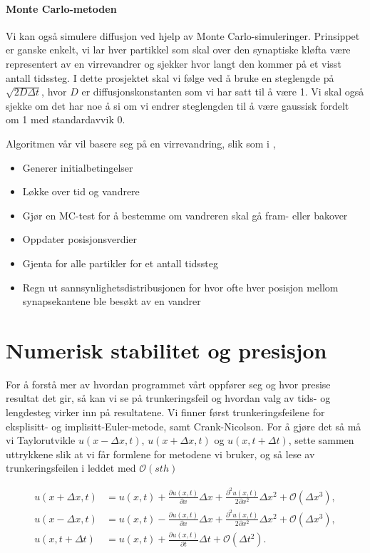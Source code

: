 \documentclass[norsk, 10pt]{article}
\begin{document}
\paragraph{Monte Carlo-metoden}
Vi kan også simulere diffusjon ved hjelp av Monte Carlo-simuleringer. Prinsippet er ganske enkelt, vi lar hver partikkel som skal over den synaptiske kløfta være representert av en virrevandrer og sjekker hvor langt den kommer på et visst antall tidssteg. I dette prosjektet skal vi følge \cite{farnell} ved å bruke en steglengde på $\sqrt{2D\Delta t}$, hvor $D$ er diffusjonskonstanten som vi har satt til å være 1. Vi skal også sjekke om det har noe å si om vi endrer steglengden til å være gaussisk fordelt om 1 med standardavvik 0.

Algoritmen vår vil basere seg på en virrevandring, slik som i \cite{mhj},
\begin{itemize}
\item 
Generer initialbetingelser
\item 
Løkke over tid og vandrere
\item
Gjør en MC-test for å bestemme om vandreren skal gå fram- eller bakover
\item
Oppdater posisjonsverdier
\item
Gjenta for alle partikler for et antall tidssteg
\item
Regn ut sannsynlighetsdistribusjonen for hvor ofte hver posisjon mellom synapsekantene ble besøkt av en vandrer
\end{itemize}

\section*{Numerisk stabilitet og presisjon}
For å forstå mer av hvordan programmet vårt oppfører seg og hvor presise resultat det gir, så kan vi se på trunkeringsfeil og hvordan valg av tids- og lengdesteg virker inn på resultatene. Vi finner først trunkeringsfeilene for eksplisitt- og implisitt-Euler-metode, samt Crank-Nicolson. For å gjøre det så må vi Taylorutvikle $u(x-\Delta x, t)$, $u(x+\Delta x, t)$ og $u(x, t+\Delta t)$, sette sammen uttrykkene slik at vi får formlene for metodene vi bruker, og så lese av trunkeringsfeilen i leddet med $\mathcal O(sth)$

\begin{align}
u(x+\Delta x,t)&=u(x,t)+\frac{\partial u(x,t)}{\partial x} \Delta x+\frac{\partial^2 u(x,t)}{2\partial x^2}\Delta x^2+\mathcal{O}(\Delta x^3),\\ \nonumber
u(x-\Delta x,t)&=u(x,t)-\frac{\partial u(x,t)}{\partial x}\Delta x+\frac{\partial^2 u(x,t)}{2\partial x^2} \Delta x^2+\mathcal{O}(\Delta x^3),\\ \nonumber
u(x,t+\Delta t)&=u(x,t)+\frac{\partial u(x,t)}{\partial t}\Delta t+  \mathcal{O}(\Delta t^2).
\end{align}
\end{document}

